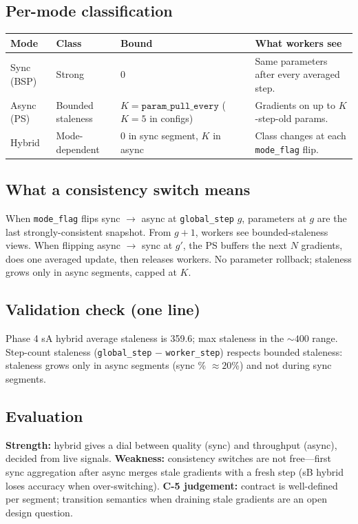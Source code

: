 \documentclass[11pt,a4paper]{article}
\begin{document}
\subsection{Per-mode classification}

\begin{table}[htbp]
  \centering
  \begin{tabularx}{\linewidth}{@{}l L L L@{}}
    \toprule
    \textbf{Mode} & \textbf{Class} & \textbf{Bound} & \textbf{What workers see} \\
    \midrule
    Sync (BSP) & Strong & 0 & Same parameters after every averaged step. \\
    Async (PS) & Bounded staleness & $K=\texttt{param\_pull\_every}$ ($K{=}5$ in configs) & Gradients on up to $K$-step-old params. \\
    Hybrid & Mode-dependent & 0 in sync segment, $K$ in async & Class changes at each \texttt{mode\_flag} flip. \\
    \bottomrule
  \end{tabularx}
\end{table}

\subsection{What a consistency switch means}

When \texttt{mode\_flag} flips sync $\to$ async at \texttt{global\_step} $g$, parameters at $g$ are the last strongly-consistent snapshot. From $g+1$, workers see bounded-staleness views. When flipping async $\to$ sync at $g'$, the PS buffers the next $N$ gradients, does one averaged update, then releases workers. No parameter rollback; staleness grows only in async segments, capped at $K$.

\subsection{Validation check (one line)}

Phase 4 sA hybrid average staleness is 359.6; max staleness in the ${\sim}400$ range. Step-count staleness (\texttt{global\_step} $-$ \texttt{worker\_step}) respects bounded staleness: staleness grows only in async segments (sync \% ${\approx}20$\%) and not during sync segments.

\subsection{Evaluation}
\textbf{Strength:} hybrid gives a dial between quality (sync) and throughput (async), decided from live signals. \textbf{Weakness:} consistency switches are not free---first sync aggregation after async merges stale gradients with a fresh step (sB hybrid loses accuracy when over-switching). \textbf{C-5 judgement:} contract is well-defined per segment; transition semantics when draining stale gradients are an open design question.
\end{document}
